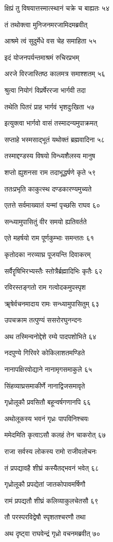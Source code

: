 क्षिप्रं तु विषयात्तस्मात्स्थानं चक्रे च बाह्यतः ५४

तं तथोक्त्वा मुनिजनमरजामिदमब्रवीत्

आश्रमे त्वं सुदुर्मेधे वस चेह समाहिता ५५

इदं योजनपर्यन्तमाश्रमं रुचिरप्रभम्

अरजे विरजास्तिष्ठ कालमत्र समाश्शतम् ५६

श्रुत्वा नियोगं विप्रर्षेररजा भार्गवी तदा

तथेति पितरं प्राह भार्गवं भृशदुःखिता ५७

इत्युक्त्वा भार्गवो वासं तस्मादन्यमुपाक्रमत्

सप्ताहे भस्मसाद्भूतं यथोक्तं ब्रह्मवादिना ५८

तस्माद्दण्डस्य विषयो विन्ध्यशैलस्य मानुष

शप्तो ह्युशनसा राम तदाभूद्धर्षणे कृते ५९

ततःप्रभृति काकुत्स्थ दण्डकारण्यमुच्यते

एतत्ते सर्वमाख्यातं यन्मां पृच्छसि राघव ६०

सन्ध्यामुपासितुं वीर समयो ह्यतिवर्तते

एते महर्षयो राम पूर्णकुम्भाः समन्ततः ६१

कृतोदका नरव्याघ्र पूजयन्ति दिवाकरम्

सर्वैरॄषिभिरभ्यस्तैः स्तोत्रैर्ब्रह्मादिभिः कृतैः ६२

रविरस्तङ्गतो राम गत्वोदकमुपस्पृश

ॠषेर्वचनमादाय रामः सन्ध्यामुपासितुम् ६३

उपचक्राम तत्पुण्यं ससरोरघुनन्दनः

अथ तस्मिन्वनोद्देशे रम्ये पादपशोभिते ६४

नदपुण्ये गिरिवरे कोकिलाशतमण्डिते

नानापक्षिरवोद्याने नानामृगसमाकुले ६५

सिंहव्याघ्रसमाकीर्णे नानाद्विजसमावृते

गृध्रोलूकौ प्रवसितौ बहून्वर्षगणानपि ६६

अथोलूकस्य भवनं गृध्रः पापविनिश्चयः

ममेदमिति कृत्वाऽसौ कलहं तेन चाकरोत् ६७

राजा सर्वस्य लोकस्य रामो राजीवलोचनः

तं प्रपद्यावहै शीघ्रं कस्यैतद्भवनं भवेत् ६८

गृध्रोलूकौ प्रपद्येतां जातकोपावमर्षिणौ

रामं प्रपद्यतौ शीघ्रं कलिव्याकुलचेतसौ ६९

तौ परस्परविद्वेषौ स्पृशतश्चरणौ तथा

अथ दृष्ट्वा राघवेन्द्रं गृध्रो वचनमब्रवीत् ७०

